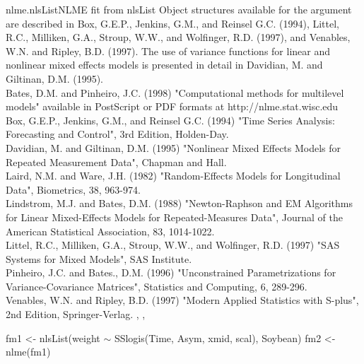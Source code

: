 \documentclass[pdftex]{article} \usepackage{url,graphicx}
\renewcommand{\Twiddle}{\mbox{\(\sim\)}}
\begin{document}
\begin{Helpfile}{nlme.nlsList}{NLME fit from nlsList Object}
structures available for the  argument are described
in Box, G.E.P., Jenkins, G.M., and Reinsel G.C. (1994), Littel, R.C.,
Milliken, G.A., Stroup, W.W., and Wolfinger, R.D. (1997), and Venables,
W.N. and Ripley, B.D. (1997). The use of variance functions for linear
and nonlinear mixed effects models is presented in detail in Davidian,
M. and Giltinan, D.M. (1995). \\
Bates, D.M. and Pinheiro, J.C. (1998) "Computational methods for
multilevel models" available in PostScript or PDF formats at
http://nlme.stat.wisc.edu\\
Box, G.E.P., Jenkins, G.M., and Reinsel G.C. (1994) "Time Series
Analysis: Forecasting and Control", 3rd Edition, Holden-Day. \\
Davidian, M. and Giltinan, D.M. (1995) "Nonlinear Mixed Effects Models
for Repeated Measurement Data", Chapman and Hall.\\
Laird, N.M. and Ware, J.H. (1982) "Random-Effects Models for
Longitudinal Data", Biometrics, 38, 963-974.  \\
Lindstrom, M.J. and Bates, D.M. (1988) "Newton-Raphson and EM
Algorithms for Linear Mixed-Effects Models for Repeated-Measures
Data", Journal of the American Statistical Association, 83,
1014-1022. \\
Littel, R.C., Milliken, G.A., Stroup, W.W., and Wolfinger, R.D. (1997)
"SAS Systems for Mixed Models", SAS Institute.\\
Pinheiro, J.C. and Bates., D.M.  (1996) "Unconstrained
Parametrizations for Variance-Covariance Matrices", Statistics and
Computing, 6, 289-296.\\
Venables, W.N. and Ripley, B.D. (1997) "Modern Applied Statistics with
S-plus", 2nd Edition, Springer-Verlag.
, ,
\need 15pt
\vspace{-16pt}
\begin{Example}
fm1 <- nlsList(weight {\Twiddle} SSlogis(Time, Asym, xmid, scal), Soybean)
fm2 <- nlme(fm1)
\end{Example}
\end{Helpfile}
\end{document}
